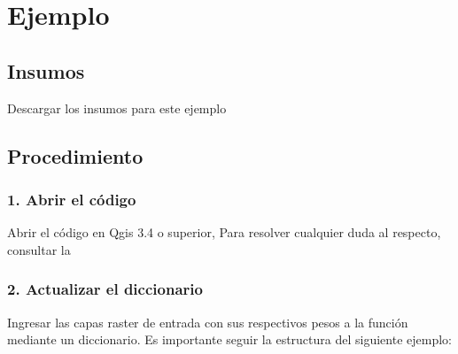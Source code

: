 \documentclass[letterpaper,10pt,spanish]{sphinxmanual}
\begin{document}
\section{Ejemplo}
\label{\detokenize{owa:ejemplo}}

\subsection{Insumos}
\label{\detokenize{owa:insumos}}
Descargar los insumos para este ejemplo 


\subsection{Procedimiento}
\label{\detokenize{owa:procedimiento}}

\subsubsection{1. Abrir el código}
\label{\detokenize{owa:abrir-el-codigo}}
Abrir el código  en Qgis 3.4 o superior,
Para resolver cualquier duda al respecto, consultar la 

\noindent{}


\subsubsection{2. Actualizar el diccionario}
\label{\detokenize{owa:actualizar-el-diccionario}}
Ingresar las capas raster de entrada con sus respectivos pesos
a la función mediante un diccionario. Es importante seguir la
estructura del siguiente ejemplo:
\end{document}
